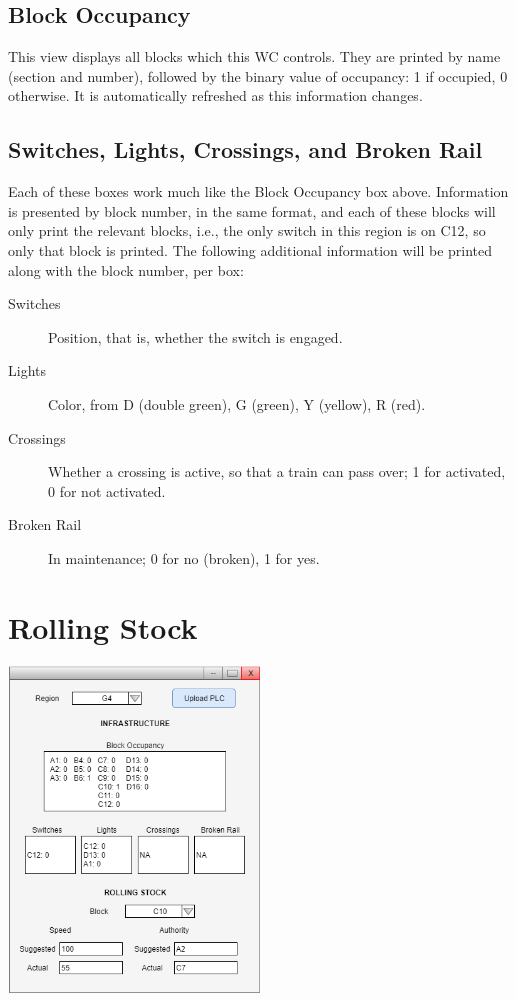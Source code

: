 \documentclass{scrreprt}
\begin{document}
\subsection{Block Occupancy}
This view displays all blocks which this WC controls.
They are printed by name (section and number), followed by the binary value of occupancy: 1 if occupied, 0 otherwise.
It is automatically refreshed as this information changes.

\subsection{Switches, Lights, Crossings, and Broken Rail}
Each of these boxes work much like the Block Occupancy box above.
Information is presented by block number, in the same format, and each of these blocks will only print the relevant blocks, i.e., the only switch in this region is on C12, so only that block is printed.
The following additional information will be printed along with the block number, per box:

\begin{description}
    \item[Switches] Position, that is, whether the switch is engaged.
    \item[Lights] Color, from D (double green), G (green), Y (yellow), R (red).
    \item[Crossings] Whether a crossing is active, so that a train can pass over; 1 for activated, 0 for not activated.
    \item[Broken Rail] In maintenance; 0 for no (broken), 1 for yes.
\end{description}


\section{Rolling Stock}
\begin{center}
    \includegraphics[trim = {0cm 0cm 0cm 6cm }, clip, width=0.5\textwidth]{wc-ui}
\end{center}
\end{document}
